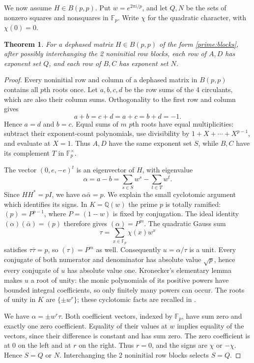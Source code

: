 \documentclass[11pt,a4paper]{article}
\newtheorem{theorem}{Theorem}[section]
\numberwithin{equation}{section}
\begin{document}
We now assume $H\in B(p,p)$. Put $w=e^{2\pi i/p}$, and let $Q,N$ be the sets of nonzero squares and nonsquares in $\mathbb F_p$. Write $\chi$ for the quadratic character, with $\chi(0)=0$.

\begin{theorem}\label{prime:partition}
For a dephased matrix $H\in B(p,p)$ of the form \eqref{prime:blocks}, after possibly interchanging the 2 noninitial row blocks, each row of $A,D$ has exponent set $Q$, and each row of $B,C$ has exponent set $N$.
\end{theorem}
\begin{proof}
Every noninitial row and column of a dephased matrix in $B(p,p)$ contains all $p$th roots once. Let $a,b,c,d$ be the row sums of the 4 circulants, which are also their column sums. Orthogonality to the first row and column gives
$$a+b=c+d=a+c=b+d=-1.$$
Hence $a=d$ and $b=c$. Equal sums of $m$ $p$th roots have equal multiplicities: subtract their exponent-count polynomials, use divisibility by $1+X+\cdots+X^{p-1}$, and evaluate at $X=1$. Thus $A,D$ have the same exponent set $S$, while $B,C$ have its complement $T$ in $\mathbb F_p^\times$.

The vector $(0,e,-e)^t$ is an eigenvector of $H$, with eigenvalue
$$\alpha=a-b=\sum_{s\in S}w^s-\sum_{t\in T}w^t.$$
Since $HH^*=pI$, we have $\alpha\bar\alpha=p$. We explain the small cyclotomic argument which identifies its signs. In $K=\mathbb Q(w)$ the prime $p$ is totally ramified: $(p)=P^{p-1}$, where $P=(1-w)$ is fixed by conjugation. The ideal identity $(\alpha)(\bar\alpha)=(p)$ therefore gives $(\alpha)=P^m$. The quadratic Gauss sum
$$\tau=\sum_{x\in\mathbb F_p}\chi(x)w^x$$
satisfies $\tau\bar\tau=p$, so $(\tau)=P^m$ as well. Consequently $u=\alpha/\tau$ is a unit. Every conjugate of both numerator and denominator has absolute value $\sqrt p$, hence every conjugate of $u$ has absolute value one. Kronecker's elementary lemma makes $u$ a root of unity: the monic polynomials of its positive powers have bounded integral coefficients, so only finitely many powers can occur. The roots of unity in $K$ are $\{\pm w^r\}$; these cyclotomic facts are recalled in \cite{washington}.

We have $\alpha=\pm w^r\tau$. Both coefficient vectors, indexed by $\mathbb F_p$, have sum zero and exactly one zero coefficient. Equality of their values at $w$ implies equality of the vectors, since their difference is constant and has sum zero. The zero coefficient is at $0$ on the left and at $r$ on the right. Thus $r=0$, and the signs are $\chi$ or $-\chi$. Hence $S=Q$ or $N$. Interchanging the 2 noninitial row blocks selects $S=Q$.
\end{proof}
\end{document}
